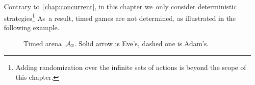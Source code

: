

Contrary to~\cref{chap:concurrent}, in this chapter we~only consider
deterministic strategies\footnote{Adding randomization over the
  infinite sets of actions is beyond the scope of this chapter.}
  As~a result, timed games are not
determined, as illustrated in the following example.

\begin{figure}[ht]
  \centering
  \caption{Timed arena~$\mathcal{A}_2$. Solid arrow is Eve's, dashed one is Adam's.}
  \label{9-fig:ta2}
\end{figure}




